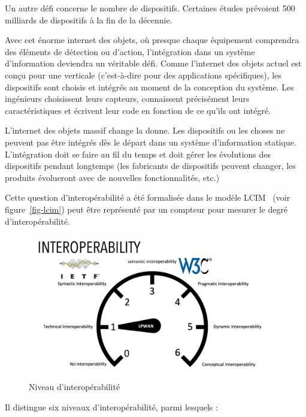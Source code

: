 Un autre défi concerne le nombre de dispositifs. Certaines études prévoient 500 milliards de dispositifs à la fin de la décennie.

Avec cet énorme internet des objets, où presque chaque équipement comprendra des éléments de détection ou d’action, l’intégration dans un système d’information deviendra un véritable défi. Comme l’internet des objets actuel est conçu pour une verticale (c'est-à-dire pour des applications spécifiques), les dispositifs sont choisis et intégrés au moment de la conception du système. Les ingénieurs choisissent leurs capteurs, connaissent précisément leurs caractéristiques et écrivent leur code en fonction de ce qu'ils ont intégré. 

L’internet des objets massif change la donne. Les dispositifs ou les choses ne peuvent pas être intégrés dès le départ dans un système d’information statique. L’intégration doit se faire au fil du temps et doit gérer les évolutions des dispositifs pendant longtemps (les fabricants de dispositifs peuvent changer, les produits évolueront avec de nouvelles fonctionnalités, etc.)

Cette question d’interopérabilité a été formalisée dans le modèle \ac{LCIM}~\cite{tolk2003levels} (voir figure~\vref{fig-lcim}) peut être représenté par un compteur pour mesurer le degré d'interopérabilité.

\begin{figure}[tbp]
\centerline{\includegraphics[width=1\columnwidth]{Pictures/TPT2020.png}}
\caption{Niveau d'interopérabilité}
\label{fig-lcim}
\end{figure}


Il distingue six niveaux d’interopérabilité, parmi lesquels :

